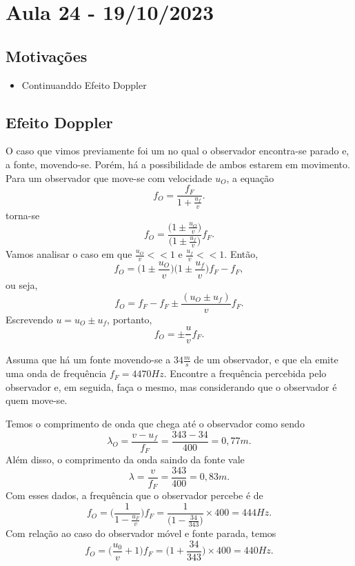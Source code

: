 \documentclass[PhysicsII/phsyicsII_notes.tex]{subfiles}
\begin{document}
\section{Aula 24 - 19/10/2023}
\subsection{Motivações}
\begin{itemize}
	\item Continuanddo Efeito Doppler
\end{itemize}
\subsection{Efeito Doppler}
O caso que vimos previamente foi um no qual o observador encontra-se parado e, a fonte, movendo-se. Porém, há a possibilidade de ambos estarem em movimento. Para um observador que
move-se com velocidade \(u_{O}\), a equação
\[
	f_{O} = \frac{f_{F}}{1+\frac{u_{f}}{v}}.
\]
torna-se
\[
	f_{O} = \frac{\biggl(1\pm \frac{u_{O}}{v}\biggr)}{\biggl(1\pm \frac{u_{f}}{v}\biggr)}f_{F}.
\]
Vamos analisar o caso em que \(\frac{u_{O}}{v} << 1\) e \(\frac{u_{f}}{v} << 1\). Então,
\[
	f_{O} = \biggl(1\pm \frac{u_{O}}{v}\biggr)\biggl(1\pm \frac{u_{f}}{v}\biggr)f_{F} - f_{F},
\]
ou seja,
\[
	f_{O} = f_{F} - f_{F}\pm \frac{(u_{O}\pm u_{f})}{v}f_{F}.
\]
Escrevendo \(u = u_{O} \pm u_{f}\), portanto,
\[
	f_{O} = \pm\frac{u}{v}f_{F}.
\]
\begin{example}
	Assuma que há um fonte movendo-se a \(34 \frac{m}{s}\) de um observador, e que ela emite uma onda de frequência \(f_{F} = 4470Hz\). Encontre a frequência percebida pelo
	observador e, em seguida, faça o mesmo, mas considerando que o observador é quem move-se.

	Temos o comprimento de onda que chega até o observador como sendo
	\[
		\lambda_{O} = \frac{v-u_{f}}{f_{F}} = \frac{343-34}{400} = 0,77m.
	\]
	Além disso, o comprimento da onda saindo da fonte vale
	\[
		\lambda = \frac{v}{f_{F}} = \frac{343}{400} = 0,83m.
	\]
	Com esses dados, a frequência que o observador percebe é de
	\[
		f_{O} = \biggl(\frac{1}{1-\frac{u_{F}}{v}}\biggr)f_{F} = \frac{1}{\biggl(1-\frac{34}{343}\biggr)}\times 400 = 444Hz.
	\]
	Com relação ao caso do observador móvel e fonte parada, temos
	\[
		f_{O} = \biggl(\frac{u_{0}}{v}+1\biggr)f_{F} = \biggl(1 + \frac{34}{343}\biggr)\times 400 = 440Hz.
	\]
\end{example}
\end{document}
